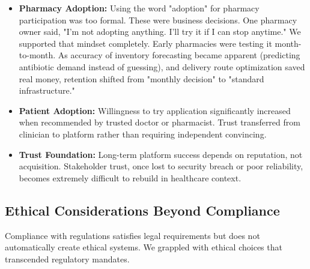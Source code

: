 \documentclass[12pt,a4paper]{report}
\begin{document}
\begin{itemize}
  \item \textbf{Pharmacy Adoption:} Using the word "adoption" for pharmacy participation was too formal. These were business decisions. One pharmacy owner said, "I'm not adopting anything. I'll try it if I can stop anytime." We supported that mindset completely. Early pharmacies were testing it month-to-month. As accuracy of inventory forecasting became apparent (predicting antibiotic demand instead of guessing), and delivery route optimization saved real money, retention shifted from "monthly decision" to "standard infrastructure."

  \item \textbf{Patient Adoption:} Willingness to try application significantly increased when recommended by trusted doctor or pharmacist. Trust transferred from clinician to platform rather than requiring independent convincing.

  \item \textbf{Trust Foundation:} Long-term platform success depends on reputation, not acquisition. Stakeholder trust, once lost to security breach or poor reliability, becomes extremely difficult to rebuild in healthcare context.
\end{itemize}

\subsection{Ethical Considerations Beyond Compliance}

Compliance with regulations satisfies legal requirements but does not automatically create ethical systems. We grappled with ethical choices that transcended regulatory mandates.
\end{document}
